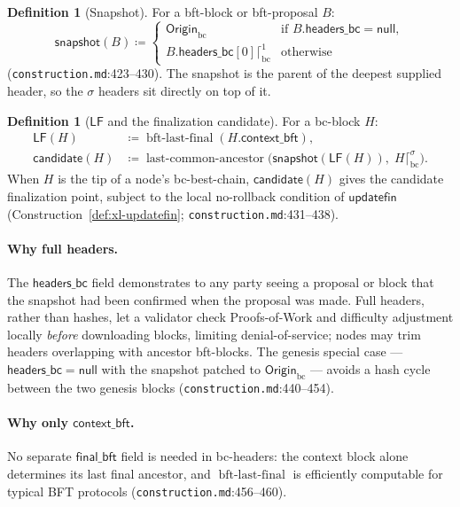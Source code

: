 \documentclass[11pt,a4paper]{article}
\theoremstyle{definition}
\newtheorem{definition}[theorem]{Definition}
\begin{document}
\begin{definition}[Snapshot]\label{def:xl-snapshot}
For a bft-block or bft-proposal $B$:
\[
\mathsf{snapshot}(B) \coloneqq
\begin{cases}
\mathsf{Origin}_{\mathrm{bc}} & \text{if } B.\mathsf{headers\_bc} =
  \mathsf{null},\\
B.\mathsf{headers\_bc}[0] \lceil^{1}_{\mathrm{bc}} & \text{otherwise}
\end{cases}
\]
(\texttt{construction.md}:423--430). The snapshot is the parent of the
deepest supplied header, so the $\sigma$ headers sit directly on top of
it.
\end{definition}

\begin{definition}[$\mathsf{LF}$ and the finalization
candidate]\label{def:xl-lf-candidate}
For a bc-block $H$:
\begin{align*}
\mathsf{LF}(H) &\coloneqq
  \operatorname{bft\text{-}last\text{-}final}(H.\mathsf{context\_bft}),\\
\mathsf{candidate}(H) &\coloneqq
  \operatorname{last\text{-}common\text{-}ancestor}\bigl(
    \mathsf{snapshot}(\mathsf{LF}(H)),\; H \lceil^{\sigma}_{\mathrm{bc}}
  \bigr).
\end{align*}
When $H$ is the tip of a node's bc-best-chain, $\mathsf{candidate}(H)$
gives the candidate finalization point, subject to the local no-rollback
condition of $\mathsf{updatefin}$
(Construction~\ref{def:xl-updatefin};
\texttt{construction.md}:431--438).
\end{definition}

\paragraph{Why full headers.} The $\mathsf{headers\_bc}$ field
demonstrates to any party seeing a proposal or block that the snapshot had
been confirmed when the proposal was made. Full headers, rather than
hashes, let a validator check Proofs-of-Work and difficulty adjustment
locally \emph{before} downloading blocks, limiting denial-of-service;
nodes may trim headers overlapping with ancestor bft-blocks. The genesis
special case --- $\mathsf{headers\_bc} = \mathsf{null}$ with the snapshot
patched to $\mathsf{Origin}_{\mathrm{bc}}$ --- avoids a hash cycle between
the two genesis blocks (\texttt{construction.md}:440--454).

\paragraph{Why only $\mathsf{context\_bft}$.} No separate
$\mathsf{final\_bft}$ field is needed in bc-headers: the context block
alone determines its last final ancestor, and
$\operatorname{bft\text{-}last\text{-}final}$ is efficiently computable
for typical BFT protocols (\texttt{construction.md}:456--460).
\end{document}
